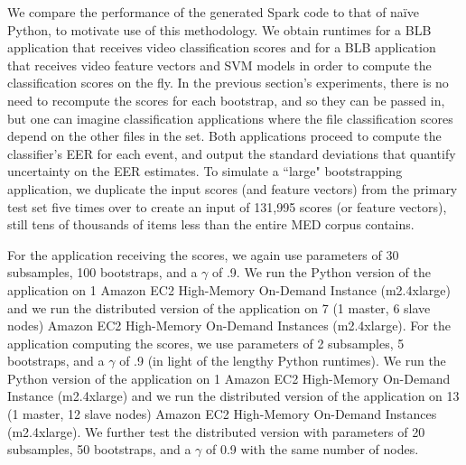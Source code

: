 We compare the performance of the generated Spark code to that of na\"{i}ve Python, to motivate use of this methodology. 
We obtain runtimes for a BLB application that receives video classification scores and for a BLB application that receives video feature vectors and SVM models in order to compute the classification scores on the fly. 
In the previous section's experiments, there is no need to recompute the scores for each bootstrap, and so they can be passed in, but one can imagine classification applications where the file classification scores depend on the other files in the set.
Both applications proceed to compute the classifier's EER for each event, and output the standard deviations that quantify uncertainty on the EER estimates. 
To simulate a ``large" bootstrapping application, we duplicate the input scores (and feature vectors) from the primary test set five times over to create an input of 131,995 scores (or feature vectors), still tens of thousands of items less than the entire MED corpus contains. 

For the application receiving the scores, we again use parameters of 30 subsamples, 100 bootstraps, and a $\gamma$ of .9. 
We run the Python version of the application on 1 Amazon EC2 \cite{ec2} High-Memory On-Demand Instance (m2.4xlarge) and we run the distributed version of the application on 7 (1 master, 6 slave nodes) Amazon EC2 High-Memory On-Demand Instances (m2.4xlarge). 
For the application computing the scores, we use parameters of 2 subsamples, 5 bootstraps, and a $\gamma$ of .9 (in light of the lengthy Python runtimes). 
We run the Python version of the application on 1 Amazon EC2 \cite{ec2} High-Memory On-Demand Instance (m2.4xlarge) and we run the distributed version of the application on 13 (1 master, 12 slave nodes) Amazon EC2 High-Memory On-Demand Instances (m2.4xlarge). We further test the distributed version with parameters of 20 subsamples, 50	bootstraps, and a $\gamma$ of 0.9 with the same number of nodes. 




